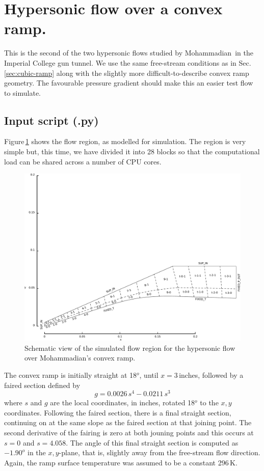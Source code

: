 
\section{Hypersonic flow over a convex ramp.}
\label{sec:convex-ramp}
%
This is the second of the two hypersonic flows studied by Mohammadian\,\cite{mohammadian_1972a}
in the Imperial College gun tunnel.
We use the same free-stream conditions as in Sec.\,\ref{sec:cubic-ramp}
along with the slightly more difficult-to-describe convex ramp geometry.
The favourable pressure gradient should make this an easier test flow to simulate.

\bigskip
\subsection{Input script (.py)}
%
Figure\,\ref{fig:convex-ramp-geometry} shows the flow region, as modelled for simulation.
The region is very simple but, this time, we have divided it into 28 blocks so that the computational load 
can be shared across a number of CPU cores.

\begin{figure}[htbp]
 \centering
 \includegraphics[width=\textwidth,viewport=0 0 650 278,clip=true]{../2D/convex-ramp/ideal-air/convex-ramp-edited.pdf}
 \caption{Schematic view of the simulated flow region for the hypersonic flow
          over Mohammadian's convex ramp.}
 \label{fig:convex-ramp-geometry}
\end{figure}

\medskip
The convex ramp is initially straight at 18$^o$, until $x = 3$\,inches, 
followed by a faired section defined by
$$
g = 0.0026 \, s^4 - 0.0211\, s^3
$$
where $s$ and $g$ are the local coordinates, in inches, rotated 18$^o$ to the $x,y$ coordinates.
Following the faired section, there is a final straight section, continuing on at the same slope as
the faired section at that joining point.
The second derivative of the fairing is zero at both jouning points and this occurs at
$s = 0$ and $s = 4.058$.
The angle of this final straight section is computed as $-1.90^o$ in the $x,y$-plane, 
that is, slightly away from the free-stream flow direction.
Again, the ramp surface temperature was assumed to be a constant 296\,K.

